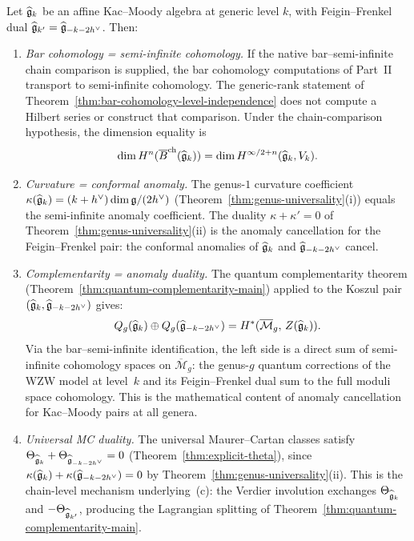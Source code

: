 \begin{corollary}
\label{cor:anomaly-duality-km}
Let $\widehat{\mathfrak{g}}_k$ be an affine Kac--Moody algebra at generic
level $k$, with Feigin--Frenkel dual
$\widehat{\mathfrak{g}}_{k'} = \widehat{\mathfrak{g}}_{-k-2h^\vee}$.  Then:
\begin{enumerate}[label=\textup{(\alph*)}]
\item \emph{Bar cohomology = semi-infinite cohomology.}
If the native bar--semi-infinite chain comparison is supplied,
the bar cohomology computations of Part~\textup{II} transport to
semi-infinite cohomology.  The generic-rank statement of
Theorem~\ref{thm:bar-cohomology-level-independence} does not compute a
Hilbert series or construct that comparison.  Under the chain-comparison
hypothesis, the dimension equality is
\[
\dim H^n(\overline{B}^{\mathrm{ch}}(\widehat{\mathfrak{g}}_k))
= \dim H^{\infty/2+n}(\widehat{\mathfrak{g}}_k, V_k).
\]

\item \emph{Curvature = conformal anomaly.}
The genus-$1$ curvature coefficient
$\kappa(\widehat{\mathfrak{g}}_k) = (k+h^\vee)\dim\mathfrak{g}/(2h^\vee)$
\textup{(}Theorem~\textup{\ref{thm:genus-universality}(i))} equals
the semi-infinite anomaly coefficient.  The duality
$\kappa + \kappa' = 0$ of
Theorem~\textup{\ref{thm:genus-universality}(ii)} is the
anomaly cancellation for the Feigin--Frenkel pair: the
conformal anomalies of $\widehat{\mathfrak{g}}_k$ and
$\widehat{\mathfrak{g}}_{-k-2h^\vee}$ cancel.

\item \emph{Complementarity = anomaly duality.}
The quantum complementarity theorem
\textup{(}Theorem~\textup{\ref{thm:quantum-complementarity-main})}
applied to the Koszul pair
$(\widehat{\mathfrak{g}}_k, \widehat{\mathfrak{g}}_{-k-2h^\vee})$ gives:
\[
Q_g(\widehat{\mathfrak{g}}_k) \oplus Q_g(\widehat{\mathfrak{g}}_{-k-2h^\vee})
= H^*(\overline{\mathcal{M}}_g,\, Z(\widehat{\mathfrak{g}}_k)).
\]
Via the bar--semi-infinite identification, the left side is a
direct sum of semi-infinite cohomology spaces on
$\overline{\mathcal{M}}_g$: the genus-$g$ quantum corrections
of the WZW model at level~$k$ and its Feigin--Frenkel dual sum to
the full moduli space cohomology.  This is the mathematical
content of anomaly cancellation for Kac--Moody pairs at all genera.

\item \emph{Universal MC duality.}
The universal Maurer--Cartan classes satisfy
$\Theta_{\widehat{\mathfrak{g}}_k} + \Theta_{\widehat{\mathfrak{g}}_{-k-2h^\vee}}
= 0$ (Theorem~\ref{thm:explicit-theta}), since
$\kappa(\widehat{\mathfrak{g}}_k) + \kappa(\widehat{\mathfrak{g}}_{-k-2h^\vee}) = 0$
by Theorem~\ref{thm:genus-universality}(ii).
This is the chain-level mechanism underlying~(c):
the Verdier involution exchanges
$\Theta_{\widehat{\mathfrak{g}}_k}$ and $-\Theta_{\widehat{\mathfrak{g}}_{k'}}$,
producing the Lagrangian splitting of
Theorem~\ref{thm:quantum-complementarity-main}.
\end{enumerate}
\end{corollary}

